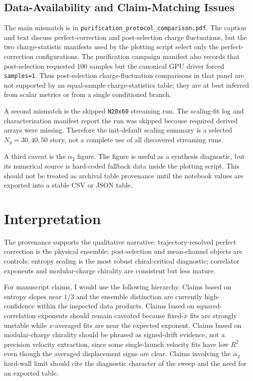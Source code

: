 \documentclass[aps,prb,onecolumn,nofootinbib,superscriptaddress]{revtex4-2}
\begin{document}
\subsection{Data-Availability and Claim-Matching Issues}

The main mismatch is in \texttt{purification\_protocol\_comparison.pdf}.  The caption and text
discuss perfect-correction and post-selection charge fluctuations, but the two charge-statistic
manifests used by the plotting script select only the perfect-correction configurations.  The
purification campaign manifest also records that post-selection requested 100 samples but the
canonical GPU driver forced \texttt{samples=1}.  Thus post-selection charge-fluctuation
comparisons in that panel are not supported by an equal-sample charge-statistics table; they
are at best inferred from scalar metrics or from a single conditioned branch.

A second mismatch is the skipped \texttt{N20x60} streaming run.  The scaling-fit log and
characterization manifest report the run was skipped because required derived arrays were
missing.  Therefore the init-default scaling summary is a selected $N_y=30,40,50$ story, not a
complete use of all discovered streaming runs.

A third caveat is the $\alpha_2$ figure.  The figure is useful as a synthesis diagnostic, but
its numerical source is hard-coded fallback data inside the plotting script.  This should not
be treated as archival table provenance until the notebook values are exported into a stable
CSV or JSON table.

\section{Interpretation}

The provenance supports the qualitative narrative: trajectory-resolved perfect correction is
the physical ensemble; post-selection and mean-channel objects are controls; entropy scaling
is the most robust chiral-critical diagnostic; correlator exponents and modular-charge
chirality are consistent but less mature.

For manuscript claims, I would use the following hierarchy.  Claims based on entropy slopes
near $1/3$ and the ensemble distinction are currently high-confidence within the inspected
data products.  Claims based on squared-correlation exponents should remain caveated because
fixed-$x$ fits are strongly unstable while $x$-averaged fits are near the expected exponent.
Claims based on modular-charge chirality should be phrased as signed-drift evidence, not a
precision velocity extraction, since some single-launch velocity fits have low $R^2$ even
though the averaged displacement signs are clear.  Claims involving the $\alpha_2$ hard-wall
limit should cite the diagnostic character of the sweep and the need for an exported table.
\end{document}
